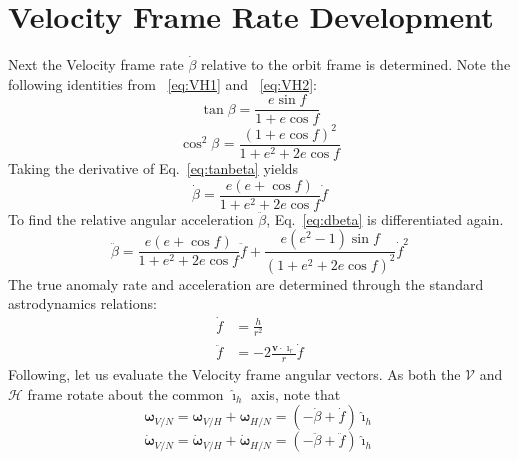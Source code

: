 \documentclass[]{AVSSimReportMemo}
\begin{document}
\section{Velocity Frame Rate Development}
Next the Velocity frame rate $\dot\beta$ relative to the orbit frame is determined.
Note the following identities from ~\eqref{eq:VH1} and ~\eqref{eq:VH2}: 
\begin{equation}
  \label{eq:tanbeta}
  \tan\beta = \frac{e \sin f}{1 + e \cos f}
\end{equation}
\begin{equation}
  \label{eq:cos2beta}
  \cos^{2}\beta^{} = \frac{(1+e \cos f)^{2}}{1+e^{2}+2 e \cos f}
\end{equation}
Taking the derivative of Eq.~\eqref{eq:tanbeta} yields
\begin{equation}
  \label{eq:dbeta}
  \dot\beta =   \frac{ e (e+\cos f)}{1+e^{2}+2 e \cos f} \dot f
\end{equation}
To find the relative angular acceleration $\ddot\beta$, Eq.~\eqref{eq:dbeta} is differentiated again.
\begin{equation}
  \label{eq:ddbeta}
  \ddot\beta = 
   \frac{e(e+\cos f)}{1+e^{2}+2 e \cos f} \ddot f
   +\frac{
  e  (e^{2}-1)\sin f
  }{
  (1+e^{2}+2 e \cos f)^{2}
  } \dot f^{2}
\end{equation}
The true anomaly rate and acceleration are determined through the standard astrodynamics relations:
\begin{align}
  \dot f &= \frac{h}{r^{2}}
  \\
  \ddot f &= - 2 \frac{\bm v \cdot \hat{\bm\imath}_{r}}{r} \dot f
\end{align}
Following, let us evaluate the Velocity frame angular vectors.  As both the $\mathcal{V}$ and $\mathcal{H}$ frame rotate about the common $\hat{\bm\imath}_{h}$ axis, note that
\begin{equation}
  \label{eq:omegaVN}
  \bm\omega_{V/N} = \bm\omega_{V/H} + \bm\omega_{H/N} = (-\dot\beta + \dot f) \hat{\bm\imath}_{h}
\end{equation}
\begin{equation}
  \label{eq:domegaVN}
  \dot{\bm\omega}_{V/N} = \dot{\bm\omega}_{V/H} + \dot{\bm\omega}_{H/N} = (-\ddot\beta + \ddot f) \hat{\bm\imath}_{h}
\end{equation}
\end{document}
